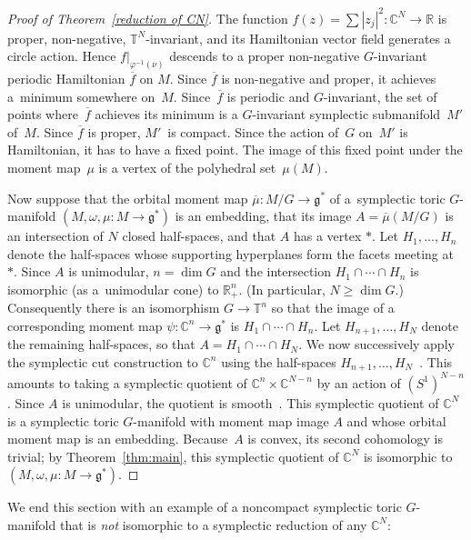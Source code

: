 \documentclass[10pt,a4paper]{amsart}
\numberwithin{equation}{section}
\begin{document}
\begin{proof}[Proof of Theorem~\ref{reduction of CN}]
The function $f(z) = \sum |z_j|^2 \colon {\mathbb C}^N\to {\mathbb R}$ is proper, non-negative,
${\mathbb T}^N$-invariant, and its Hamiltonian vector f\/ield generates a circle action.
Hence $f|_{\varphi^{-1} (\nu)}$ descends to
a proper non-negative $G$-invariant periodic Hamiltonian $\overline{f}$ on
$M$.  Since $\overline{f}$ is non-negative and proper, it achieves a~minimum somewhere on~$M$.  Since~$\overline{f}$ is periodic and
$G$-invariant, the set of points where~$\overline{f}$ achieves its minimum
is a $G$-invariant symplectic submanifold~$M'$ of~$M$.  Since $\overline{f}$
is proper, $M'$~is compact.  Since the action of~$G$ on~$M'$ is
Hamiltonian, it has to have a f\/ixed point.  The image of this f\/ixed
point under the moment map~$\mu$ is a vertex of the polyhedral set~$\mu(M)$.


Now suppose that the orbital moment map $\overline{\mu} \colon M/G \to {\mathfrak g}^*$ of a~symplectic toric $G$-manifold $(M,\omega,\mu \colon M\to {\mathfrak g}^*)$ is an
embedding, that its image $A =\overline{\mu}(M/G)$ is an intersection of
$N$ closed half-spaces, and that $A$ has a vertex $*$.
Let $H_1, \ldots, H_n$ denote the half-spaces
whose supporting hyperplanes form the facets meeting at~$*$.
Since $A$ is unimodular, $n=\dim G$
and the intersection $H_1\cap \cdots \cap H_n$ is isomorphic (as a~unimodular cone) to ${\mathbb R}^n_+$.  (In particular, $N \geq \dim G$.)
Consequently there is an isomorphism
$G\to {\mathbb T}^n$ so that the image of a corresponding moment map $\psi \colon {\mathbb C}^n
\to {\mathfrak g}^*$ is $H_1\cap \cdots \cap H_n$. Let $H_{n+1},\ldots, H_N$ denote
the remaining half-spaces, so that $A= H_1\cap\cdots\cap H_N$.  We now
successively apply the symplectic cut construction to ${\mathbb C}^n$ using the
half-spaces $H_{n+1},\ldots, H_N$~\cite{Lcuts}.  This amounts to
taking a symplectic quotient of ${\mathbb C}^n\times {\mathbb C}^{N-n}$ by an action of
$(S^1)^{N-n}$.  Since $A$ is unimodular, the quotient is smooth~\cite{LMTW}.  This symplectic quotient of ${\mathbb C}^N$ is
a symplectic toric $G$-manifold with moment map image $A$
and whose orbital moment map is an embedding.
Because~$A$ is convex, its second cohomology is trivial;
by Theorem~\ref{thm:main}, this symplectic quotient
of ${\mathbb C}^N$ is isomorphic to $(M,\omega,\mu \colon M \to {\mathfrak g}^*)$.
\end{proof}

We end this section with an example of a noncompact symplectic
toric $G$-manifold that is \emph{not} isomorphic to a symplectic
reduction of any ${\mathbb C}^N$:
\end{document}
